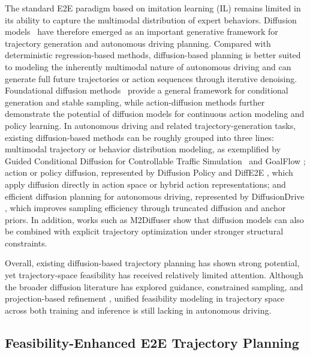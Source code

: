\documentclass[3p,times,authoryear]{elsarticle}
\begin{document}
The standard E2E paradigm based on imitation learning (IL) remains limited in its ability to capture the multimodal distribution of expert behaviors. Diffusion models~\citep{DiffusionD} have therefore emerged as an important generative framework for trajectory generation and autonomous driving planning. Compared with deterministic regression-based methods, diffusion-based planning is better suited to modeling the inherently multimodal nature of autonomous driving and can generate full future trajectories or action sequences through iterative denoising. Foundational diffusion methods~\citep{ho2020ddpm, song2020ddim} provide a general framework for conditional generation and stable sampling, while action-diffusion methods \citep{chi2025diffusionpolicy} further demonstrate the potential of diffusion models for continuous action modeling and policy learning. In autonomous driving and related trajectory-generation tasks, existing diffusion-based methods can be roughly grouped into three lines: multimodal trajectory or behavior distribution modeling, as exemplified by Guided Conditional Diffusion for Controllable Traffic Simulation~\citep{zhong2023ctg} and GoalFlow \citep{xing2025goalflow}; action or policy diffusion, represented by Diffusion Policy \citep{chi2025diffusionpolicy} and DiffE2E \citep{zhao2025diffe2e}, which apply diffusion directly in action space or hybrid action representations; and efficient diffusion planning for autonomous driving, represented by DiffusionDrive \citep{liao2025diffusiondrive}, which improves sampling efficiency through truncated diffusion and anchor priors. In addition, works such as M2Diffuser \citep{yan2025m2diffuser} show that diffusion models can also be combined with explicit trajectory optimization under stronger structural constraints.

Overall, existing diffusion-based trajectory planning has shown strong potential, yet trajectory-space feasibility has received relatively limited attention. Although the broader diffusion literature has explored guidance, constrained sampling, and projection-based refinement \citep{christopher2024pgdm,zheng2025diffusionplanner}, unified feasibility modeling in trajectory space across both training and inference is still lacking in autonomous driving.

\subsection{Feasibility-Enhanced E2E Trajectory Planning}
\end{document}
